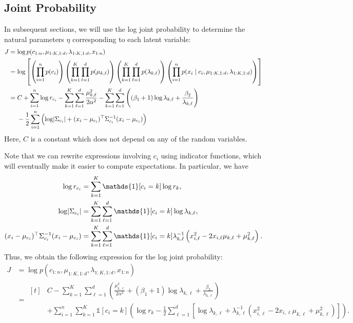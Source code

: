 \documentclass[11pt]{article}
\begin{document}
\subsection{Joint Probability}

In subsequent sections, we will use the log joint probability to determine the natural parameters $\eta$ corresponding to each latent variable:
\begin{align}
J
&= \log p(c_{1:n}, \mu_{1:K,1:d}, \lambda_{1:K,1:d}, x_{1:n}) \\
&= \log \left[
        \left( \prod_{i=1}^n p(c_i) \right)
        \left( \prod_{k=1}^K \prod_{\ell=1}^d p(\mu_{k, \ell}) \right)
        \left( \prod_{k=1}^K \prod_{\ell=1}^d p(\lambda_{k, \ell}) \right)
        \left( \prod_{i=1}^n p(x_i \mid c_i, \mu_{1:K,1:d}, \lambda_{1:K,1:d}) \right)
    \right] \\
&= \begin{aligned}[t]
    &C + \sum_{i=1}^n \log r_{c_i}
    - \sum_{k=1}^K \sum_{\ell=1}^d \frac{\mu_{k, \ell}^2}{2\alpha^2}
    - \sum_{k=1}^K \sum_{\ell=1}^d \left( (\beta_1 + 1) \log \lambda_{k,\ell} + \frac{\beta_2}{\lambda_{k,\ell}} \right) \\
    &- \frac{1}{2} \sum_{i=1}^n \left( \log \abs{ \Sigma_{c_i} } + (x_i - \mu_{c_i})^\top \Sigma_{c_i}^{-1} (x_i - \mu_{c_i}) \right)
    \end{aligned}
\end{align}
Here, $C$ is a constant which does not depend on any of the random variables.

Note that we can rewrite expressions involving $c_i$ using indicator functions, which will eventually make it easier to compute expectations.
In particular, we have
\begin{align}
\log r_{c_i}
&= \sum_{k=1}^K \mathds{1}[c_i = k] \log r_k, \\
\log \abs{\Sigma_{c_i}}
&= \sum_{k=1}^K \sum_{\ell=1}^d \mathds{1}[c_i = k] \log \lambda_{k,\ell}, \\
(x_i - \mu_{c_i})^\top \Sigma_{c_i}^{-1} (x_i - \mu_{c_i})
&= \sum_{k=1}^K \sum_{\ell=1}^d \mathds{1}[c_i = k] \lambda_{k,\ell}^{-1} \left( x_{i,\ell}^2 - 2 x_{i,\ell} \mu_{k,\ell} + \mu_{k,\ell}^2 \right).
\end{align}
Thus, we obtain the following expression for the log joint probability:
\begin{align}
J
&= \log p(c_{1:n}, \mu_{1:K,1:d}, \lambda_{1:K,1:d}, x_{1:n}) \\
\label{eq:logJointExample}
&= \begin{aligned}[t]
    & C - \sum_{k=1}^K \sum_{\ell=1}^d \left( \frac{\mu_{k, \ell}^2}{2\alpha^2} + (\beta_1 + 1) \log \lambda_{k,\ell} + \frac{\beta_2}{\lambda_{k,\ell}} \right) \\
    & + \sum_{i=1}^n \sum_{k=1}^K \mathds{1}[c_i = k] \left( \log r_k - \frac{1}{2}
        \sum_{\ell=1}^d \left[ \log \lambda_{k,\ell} + \lambda_{k,\ell}^{-1} \left( x_{i,\ell}^2 - 2 x_{i,\ell} \mu_{k,\ell} + \mu_{k,\ell}^2 \right) \right]
    \right).
    \end{aligned}
\end{align}
\end{document}
